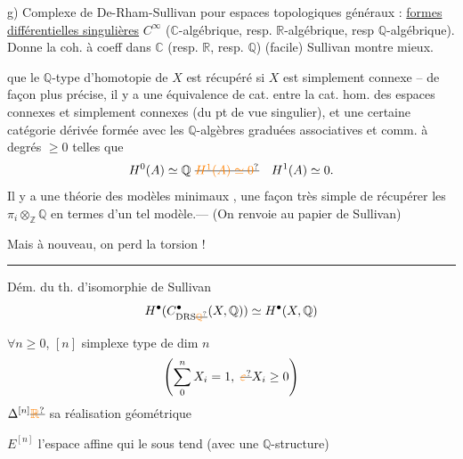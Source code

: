g) Complexe de De-Rham-Sullivan pour espaces topologiques généraux : \uline{formes différentielles singulières} $C^\infty$  ($\mathbb C$-algébrique, resp. $\mathbb R$-algébrique, resp $\mathbb Q$-algébrique). Donne la coh. à coeff dans $\mathbb C$ (resp. $\mathbb R$, resp. $\mathbb Q$) (facile) Sullivan montre mieux.

que le $\mathbb Q$-type d'homotopie de $X$ est récupéré si $X$ est simplement connexe -- de façon plus précise, il y a  une équivalence de cat.  entre la cat. hom.  des espaces connexes et simplement connexes (du pt de vue singulier), et une certaine catégorie dérivée formée avec les $\mathbb Q$-algèbres graduées associatives et comm.  à degrés $\geq 0$ telles que
\[
H^0(A)\simeq\mathbb Q\ \deleted{\unsure{H^1(A)\simeq 0}}\quad H^1(A)\simeq 0 .
\]
Il y a une théorie des modèles minimaux , une façon très simple de récupérer les $\pi_i\otimes_{\mathbb Z}\mathbb Q$ en termes d'un tel modèle.--- (On renvoie au papier de Sullivan)

Mais à nouveau, on perd la torsion !

\noindent\rule{\linewidth}{0.3pt}

Dém. du th. d'isomorphie de Sullivan
\[
H^\bullet(C^\bullet_{\mathrm{DRS}\deleted{\unsure{\mathbb Q}}}(X,\mathbb Q))\simeq H^\bullet(X,\mathbb Q)
\]

$\forall n\geq 0$, $[n]$ simplexe type de dim $n$
\[
\left(\sum_0^n X_i=1,\ \deleted{\unsure{\varepsilon}}X_i\geq 0\right)
\]
$\Delta^{[n]}\deleted{\unsure{\mathbb R}}$ sa réalisation géométrique

$E^{[n]}$ l'espace affine qui le sous tend (avec une $\mathbb Q$-structure)

